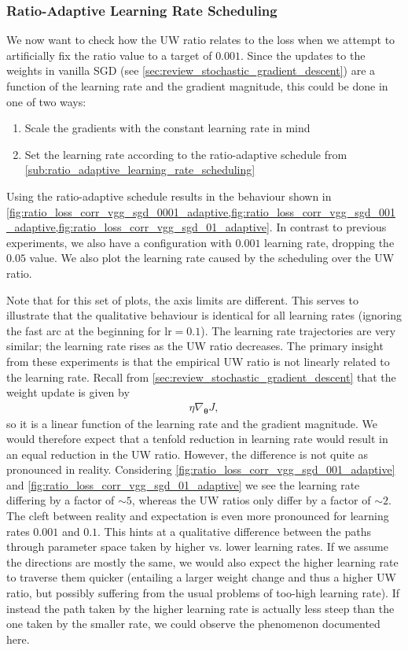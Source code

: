 \subsubsection{Ratio-Adaptive Learning Rate Scheduling}

We now want to check how the UW ratio relates to the loss when we attempt to
artificially fix the ratio value to a target of $0.001$. Since the updates to the
weights in vanilla SGD (see \cref{sec:review_stochastic_gradient_descent}) are a
function of the learning rate and the gradient magnitude, this could be done in
one of two ways:
\begin{enumerate}
    \item Scale the gradients with the constant learning rate in mind
    \item Set the learning rate according to the ratio-adaptive schedule from
        \cref{sub:ratio_adaptive_learning_rate_scheduling}
\end{enumerate}

Using the ratio-adaptive schedule results in the behaviour shown in
\cref{fig:ratio_loss_corr_vgg_sgd_0001_adaptive,fig:ratio_loss_corr_vgg_sgd_001_adaptive,fig:ratio_loss_corr_vgg_sgd_01_adaptive}.
In contrast to previous experiments, we also have a configuration with $0.001$
learning rate, dropping the $0.05$ value. We also plot the learning rate caused
by the scheduling over the UW ratio.

Note that for this set of plots, the axis limits are different. This serves to
illustrate that the qualitative behaviour is identical for all learning rates
(ignoring the fast arc at the beginning for $\text{lr}=0.1$). The learning rate
trajectories are very similar; the learning rate rises as the UW ratio
decreases. The primary insight from these experiments is that the empirical UW ratio is
not linearly related to the learning rate. Recall from
\cref{sec:review_stochastic_gradient_descent} that the weight update is given by
\begin{align}
    \eta \nabla_{\boldsymbol\theta}J,
\end{align}
so it is a linear function of the learning rate and the gradient magnitude. We
would therefore expect that a tenfold reduction in learning rate would result in
an equal reduction in the UW ratio. However, the difference is not quite as
pronounced in reality. Considering
\cref{fig:ratio_loss_corr_vgg_sgd_001_adaptive} and
\cref{fig:ratio_loss_corr_vgg_sgd_01_adaptive} we see the learning rate
differing by a factor of $\sim{}5$, whereas the UW ratios only differ by a factor of
$\sim{}2$. The cleft between reality and expectation is even more pronounced for
learning rates $0.001$ and $0.1$. This hints at a qualitative difference between
the paths through parameter space taken by higher vs. lower learning rates. If
we assume the directions are mostly the same, we would also expect the higher
learning rate to traverse them quicker (entailing a larger weight change and
thus a higher UW ratio, but possibly suffering from the usual problems of
too-high learning rate). If instead the path taken by the higher learning rate
is actually less steep than the one taken by the smaller rate, we could observe
the phenomenon documented here.

